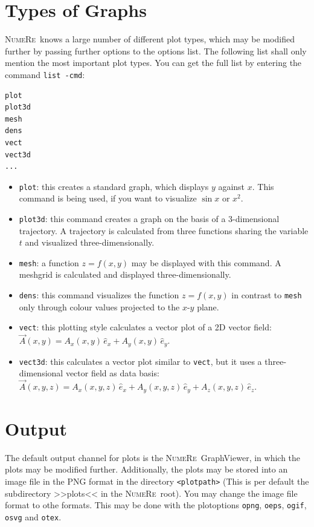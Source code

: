 \documentclass[DIV=14,headsepline,footsepline]{scrbook}
\newcommand{\NR}{\textsc{Nu\-me\-Re}}
\begin{document}
			\section{Types of Graphs}
				\NR\ knows a large number of different plot types, which may be modified further by passing further options to the options list. The following list shall only mention the most important plot types. You can get the full list by entering the command \verb+list -cmd+:
				\begin{lstlisting}
plot
plot3d
mesh
dens
vect
vect3d
...
				\end{lstlisting}
				\begin{itemize}
					\item \verb+plot+: this creates a standard graph, which displays $y$ against $x$. This command is being used, if you want to visualize $\sin x$ or $x^2$.
					\item \verb+plot3d+: this command creates a graph on the basis of a 3-dimensional trajectory. A trajectory is calculated from three functions sharing the variable $t$ and visualized three-di\-men\-sion\-al\-ly.
					\item \verb+mesh+: a function $z = f(x,y)$ may be displayed with this command. A meshgrid is calculated and displayed three-dimensionally.
					\item \verb+dens+: this command visualizes the function $z = f(x,y)$ in contrast to \verb+mesh+ only through colour values projected to the $x$-$y$ plane.
					\item \verb+vect+: this plotting style calculates a vector plot of a 2D vector field: $\vec A(x,y) = A_x(x,y)\,\hat e_x + A_y(x,y)\,\hat e_y$.
					\item \verb+vect3d+: this calculates a vector plot similar to \verb+vect+, but it uses a three-dimensional vector field as data basis: $\vec A(x,y,z) = A_x(x,y,z)\,\hat e_x + A_y(x,y,z)\,\hat e_y + A_z(x,y,z)\,\hat e_z$.
				\end{itemize}
			\section{Output}
				The default output channel for plots is the \NR\ GraphViewer, in which the plots may be modified further. Additionally, the plots may be stored into an image file in the PNG format in the directory \verb+<plotpath>+ (This is per default the subdirectory >>plots<< in the \NR\ root). You may change the image file format to othe formats. This may be done with the plotoptions \verb+opng+, \verb+oeps+, \verb+ogif+, \verb+osvg+ and \verb+otex+.
				
\end{document}
